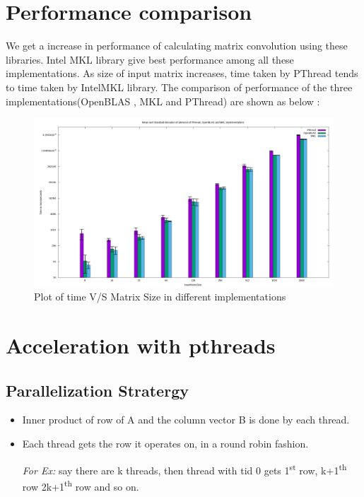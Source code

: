 \documentclass{article}
\begin{document}
\section{Performance comparison}
We get a increase in performance of calculating matrix convolution using these libraries.
Intel MKL library give best performance among all these implementations.\newline
As size of input matrix increases, time taken by PThread tends to time taken by IntelMKL library.\newline
The comparison of performance of the three implementations(OpenBLAS , MKL and PThread) are shown as below :
\begin{figure}
  \includegraphics[width=\linewidth]{performance.png}
  \caption{Plot of time V/S Matrix Size in different implementations}
\end{figure}

\section{Acceleration with pthreads}

\subsection{Parallelization Stratergy}

\begin{itemize}
    \item Inner product of row of A and the column vector B 
    is done by each thread.

    \item Each thread gets the row it operates on, in a 
    round robin fashion. 
    
    \textit{For Ex:} say there are k threads, then thread with 
    tid 0 gets 1\textsuperscript{st} row, k+1\textsuperscript{th} 
    row 2k+1\textsuperscript{th} row and so on.


\end{itemize}
\end{document}

